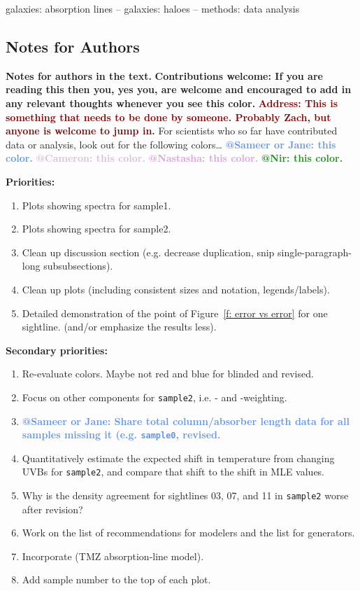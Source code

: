 \documentclass[fleqn,usenatbib]{mnras}
\makeatletter
\newcommand{\thoughts}[1]{\textcolor{BurntOrange}{\textbf{Contributions welcome: #1}}}
\newcommand{\todo}[1]{\textcolor{Maroon}{\textbf{Address: #1}}}
\newcommand{\atsameer}[1]{\textcolor{CornflowerBlue}{\textbf{@Sameer or Jane: #1}}}
\newcommand{\atcameron}[1]{\textcolor{Thistle}{\textbf{@Cameron: #1}}}
\newcommand{\atnastasha}[1]{\textcolor{Plum}{\textbf{@Nastasha: #1}}}
\newcommand{\atnir}[1]{\textcolor{ForestGreen}{\textbf{@Nir: #1}}}
\makeatother
\begin{document}
\begin{keywords}
galaxies: absorption lines -- galaxies: haloes -- methods: data analysis
\end{keywords}



\subsection{Notes for Authors}

\textbf{Notes for authors in the text.}
\thoughts{If you are reading this then you, yes you, are welcome and encouraged to add in any relevant thoughts whenever you see this color.}
\todo{This is something that needs to be done by someone. Probably Zach, but anyone is welcome to jump in.}
For scientists who so far have contributed data or analysis, look out for the following colors\ldots
\atsameer{this color.}
\atcameron{this color.}
\atnastasha{this color.}
\atnir{this color.}

\textbf{Priorities:}
\begin{enumerate}
    \item Plots showing spectra for sample1.
    \item Plots showing spectra for sample2.
    \item Clean up discussion section (e.g. decrease duplication, snip single-paragraph-long subsubsections).
    \item Clean up plots (including consistent sizes and notation, legends/labels).
    \item Detailed demonstration of the point of Figure~\ref{f: error vs error} for one sightline. (and/or emphasize the results less).
\end{enumerate}

\textbf{Secondary priorities:}
\begin{enumerate}
    \item Re-evaluate colors. Maybe not red and blue for blinded and revised.
    \item Focus on other components for \texttt{sample2}, i.e. - and -weighting.
    \item \atsameer{Share total column/absorber length data for all samples missing it (e.g. \texttt{sample0}, revised.}
    \item Quantitatively estimate the expected shift in temperature from changing UVBs for \texttt{sample2}, and compare that shift to the shift in MLE values.
    \item Why is the density agreement for sightlines 03, 07, and 11 in \texttt{sample2} worse after revision?
    \item Work on the list of recommendations for modelers and the list for generators.
    \item Incorporate \cite{tan2021Model} (TMZ absorption-line model).
    \item Add sample number to the top of each plot.
\end{enumerate}
\end{document}
